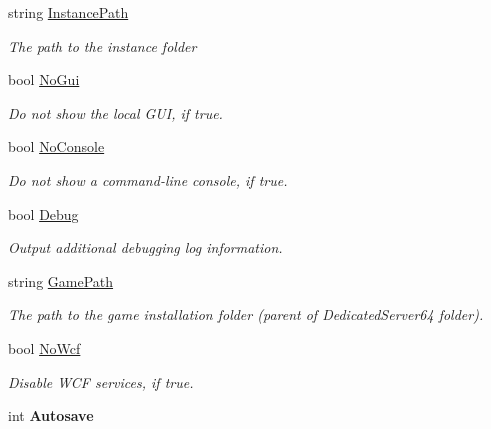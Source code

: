 \begin{DoxyCompactItemize}
\item 
string \hyperlink{class_s_e_mod_a_p_i_extensions_1_1_a_p_i_1_1_command_line_args_a8a0bf03c7ac9ede705ef053ebb272268}{Instance\+Path}
\begin{DoxyCompactList}\small\item\em The path to the instance folder\end{DoxyCompactList}\item 
bool \hyperlink{class_s_e_mod_a_p_i_extensions_1_1_a_p_i_1_1_command_line_args_a7322a22ae906f59fee262a975ca10fe4}{No\+Gui}
\begin{DoxyCompactList}\small\item\em Do not show the local G\+U\+I, if true.\end{DoxyCompactList}\item 
bool \hyperlink{class_s_e_mod_a_p_i_extensions_1_1_a_p_i_1_1_command_line_args_aa3373c02e6e983e56b16fa692839b876}{No\+Console}
\begin{DoxyCompactList}\small\item\em Do not show a command-\/line console, if true.\end{DoxyCompactList}\item 
bool \hyperlink{class_s_e_mod_a_p_i_extensions_1_1_a_p_i_1_1_command_line_args_ad4b48077c00efea64bd5f24e1203af54}{Debug}
\begin{DoxyCompactList}\small\item\em Output additional debugging log information.\end{DoxyCompactList}\item 
string \hyperlink{class_s_e_mod_a_p_i_extensions_1_1_a_p_i_1_1_command_line_args_a6b0e4cf3ad89f66f490eefb67f29a5b5}{Game\+Path}
\begin{DoxyCompactList}\small\item\em The path to the game installation folder (parent of Dedicated\+Server64 folder).\end{DoxyCompactList}\item 
bool \hyperlink{class_s_e_mod_a_p_i_extensions_1_1_a_p_i_1_1_command_line_args_ae847e24b21847430cc5ac8d6e5ddff69}{No\+Wcf}
\begin{DoxyCompactList}\small\item\em Disable W\+C\+F services, if true.\end{DoxyCompactList}\item 
\hypertarget{class_s_e_mod_a_p_i_extensions_1_1_a_p_i_1_1_command_line_args_ab646550725b0c7d75c0e1aa0fd608094}{}int {\bfseries Autosave}\label{class_s_e_mod_a_p_i_extensions_1_1_a_p_i_1_1_command_line_args_ab646550725b0c7d75c0e1aa0fd608094}


\end{DoxyCompactItemize}
